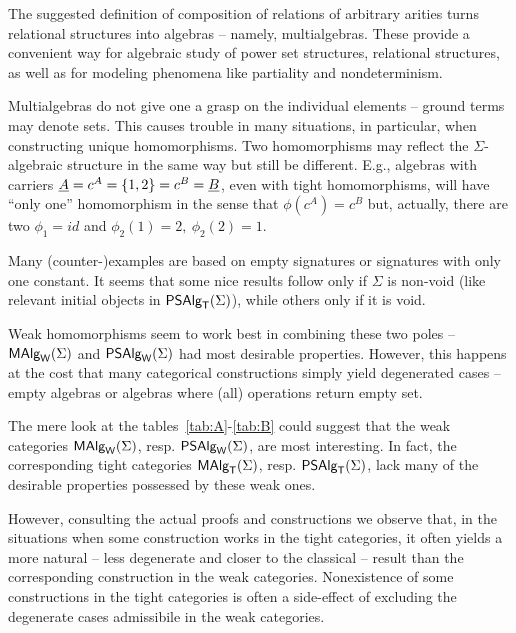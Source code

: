 \documentclass[10pt]{article}
\begin{document}
The suggested definition of composition of relations of arbitrary
arities turns relational structures into algebras -- namely,
multialgebras.  These provide a convenient way for algebraic study of
power set structures, relational structures, as well as for modeling
phenomena like partiality and nondeterminism.

\begin{LS}
\item
Multialgebras do not give one a grasp on the individual elements --
ground terms may denote sets. This causes trouble in many situations,
in particular, when constructing unique homomorphisms. Two
homomorphisms may reflect the $\Sigma$-algebraic structure in the same
way but still be different.  E.g., algebras with carriers $\underline {A}=c^A=\{1,2\}=c^B=\underline {B}$, even with tight homomorphisms, will have
``only one'' homomorphism in the sense that $\phi(c^A)=c^B$ but,
actually, there are two $\phi_1 = id$ and $\phi_2(1)=2,\ \phi_2(2)=1$.

\item
Many (counter-)examples are based on empty signatures or signatures
with only one constant.  It seems that some nice results follow only
if $\Sigma$ is non-void (like relevant initial objects in $\mbox{\sf PSAlg}_{\sf T}(\Sigma)$),
while others only if it is void.
\begin{LSA}
\item
Weak homomorphisms seem to work best in combining these two poles --
$\mbox{\rm\sf MAlg}_{\sf W}(\Sigma)$ and $\mbox{\sf PSAlg}_{\sf W}(\Sigma)$ had most desirable properties. However, this
happens at the cost that many categorical constructions simply yield
degenerated cases -- empty algebras or algebras where (all) operations
return empty set.
\item
The mere look at the tables~\ref{tab:A}-\ref{tab:B} could suggest that
the weak categories $\mbox{\rm\sf MAlg}_{\sf W}(\Sigma)$, resp. $\mbox{\sf PSAlg}_{\sf W}(\Sigma)$, are most interesting. In
fact, the corresponding tight categories $\mbox{\rm\sf MAlg}_{\sf T}(\Sigma)$, resp. $\mbox{\sf PSAlg}_{\sf T}(\Sigma)$, lack
many of the desirable properties possessed by these weak ones.

However, consulting the actual proofs and constructions we observe
that, in the situations when some construction works in the tight
categories, it often yields a more natural -- less degenerate and
closer to the classical -- result than the corresponding construction
in the weak categories. Nonexistence of some constructions in the
tight categories is often a side-effect of excluding the degenerate
cases admissibile in the weak categories.
\end{LSA}


\end{LS}
\end{document}
